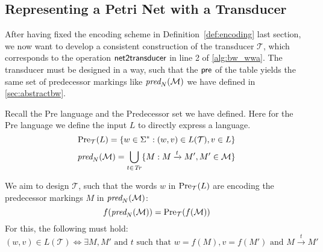 \subsection{Representing a Petri Net with a Transducer}
After having fixed the encoding scheme in Definition~\autoref{def:encoding} last section, we now want to develop a consistent construction  of the transducer $\mathcal{T}$, which corresponds to the operation $\operatorname{\textsf{net2transducer}}$ in line 2 of \autoref{alg:bw_wwa}. 
The transducer must be designed in a way, such that the $\operatorname{\textsf{pre}}$ of the table yields the same set of predecessor markings like $\operatorname{\textit{pred}}_{N}(\mathcal{M})$  we have defined in \autoref{sec:abstractbw}.

\par

Recall the Pre language and the Predecessor set we have defined. Here for the Pre language we define the input $L$ to directly express a language.
\begin{equation*}
\operatorname{\text{Pre}}_{\mathcal{T}}(L) = \{ w \in \Sigma^{*}: (w,v) \in L(\mathcal{T}), v \in L \} 
\end{equation*}
\begin{equation*}
\operatorname{\textit{pred}}_{N}(\mathcal{M}) = \bigcup_{t \in \mathit{Tr}} \{M : M \xrightarrow{t} M', M' \in \mathcal{M} \}
\end{equation*}

We aim to design $\mathcal{T}$, such that the words $w$ in $\operatorname{\text{Pre}}_{\mathcal{T}}(L)$ are encoding the predecessor markings $M$ in $\operatorname{\textit{pred}}_{N}(\mathcal{M})$:
\begin{equation*}
f(\operatorname{\textit{pred}}_{N}(\mathcal{M})) = \operatorname{\text{Pre}}_{\mathcal{T}}(f(\mathcal{M}))
\end{equation*}
For this, the following must hold:
\begin{equation*}
(w,v) \in L(\mathcal{T}) \iff \exists M,M' \text{ and } t \text{ such that } w = f(M), v = f(M') \text{ and } M \xrightarrow{t} M' 
\end{equation*}



